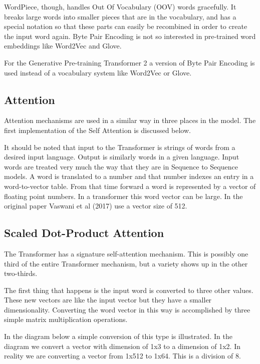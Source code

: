 WordPiece, though, handles Out Of Vocabulary (OOV) words gracefully. It breaks large words into smaller pieces that are in the vocabulary, and has a special notation so that these parts can easily be recombined in order to create the input word again. Byte Pair Encoding is not so interested in pre-trained word embeddings like Word2Vec and Glove.

For the Generative Pre-training Transformer 2 a version of Byte Pair Encoding is used instead of a vocabulary system like Word2Vec or Glove.


\subsection*{Attention}
Attention mechanisms are used in a similar way in three places in the model. The first implementation of the Self Attention is discussed below.

It should be noted that input to the Transformer is strings of words from a desired input language. Output is similarly words in a given language. Input words are treated very much the way that they are in Sequence to Sequence models. A word is translated to a number and that number indexes an entry in a word-to-vector table. From that time forward a word is represented by a vector of floating point numbers. In a transformer this word vector can be large. In the original paper Vaswani et al (2017)\cite{Vaswani2017AttentionIA} use a vector size of 512. 

\subsection*{Scaled Dot-Product Attention}

The Transformer has a signature self-attention mechanism. This is possibly one third of the entire Transformer mechanism, but a variety shows up in the other two-thirds. 

The first thing that happens is the input word is converted to three other values. These new vectors are like the input vector but they have a smaller dimensionality. Converting the word vector in this way is accomplished by three simple matrix multiplication operations.

In the diagram below a simple conversion of this type is illustrated. In the diagram we convert a vector with dimension of 1x3 to a dimension of 1x2. In reality we are converting a vector from 1x512 to 1x64. This is a division of 8.




